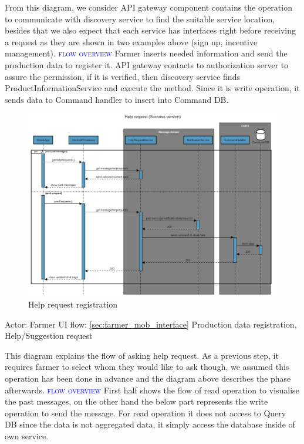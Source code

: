 From this diagram, we consider API gateway component contains the operation to communicate with discovery service to find the suitable service location, besides that we also expect that each service has interfaces right before receiving a request as they are shown in two examples above (sign up, incentive management).
\newline
\textsc{\textcolor{blue}{flow overview}}
\newline
Farmer inserts needed information and send the production data to register it. API gateway contacts to authorization server to assure the permission, if it is verified, then discovery service finds ProductInformationService and execute the method. Since it is write operation, it sends data to Command handler to insert into Command DB.  

\newpage
\begin{figure}[H]
	\centering
    \includegraphics[width=\textwidth]{Images/sequence-diagram/help-request.png}
	\caption{\label{fig:se_help}Help request registration}
\end{figure}
Actor: Farmer
\newline
UI flow: {\ref{sec:farmer_mob_interface} Production data registration, Help/Suggestion request}

This diagram explains the flow of asking help request.
As a previous step, it requires farmer to select whom they would like to ask though, we assumed this operation has been done in advance and the diagram above describes the phase afterwards.
\newline
\textsc{\textcolor{blue}{flow overview}}
\newline
First half shows the flow of read operation to visualise the past messages, on the other hand the below part represents the write operation to send the message. 
For read operation it does not access to Query DB since the data is not aggregated data, it simply access the database inside of own service.

